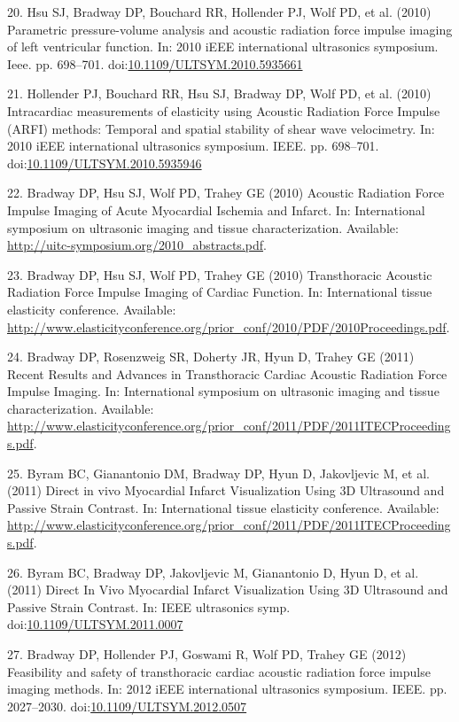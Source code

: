 \documentclass[]{article}
\begin{document}
20. Hsu SJ, Bradway DP, Bouchard RR, Hollender PJ, Wolf PD, et al.
(2010) Parametric pressure-volume analysis and acoustic radiation force
impulse imaging of left ventricular function. In: 2010 iEEE
international ultrasonics symposium. Ieee. pp. 698--701.
doi:\href{http://dx.doi.org/10.1109/ULTSYM.2010.5935661}{10.1109/ULTSYM.2010.5935661}

21. Hollender PJ, Bouchard RR, Hsu SJ, Bradway DP, Wolf PD, et al.
(2010) Intracardiac measurements of elasticity using Acoustic Radiation
Force Impulse (ARFI) methods: Temporal and spatial stability of shear
wave velocimetry. In: 2010 iEEE international ultrasonics symposium.
IEEE. pp. 698--701.
doi:\href{http://dx.doi.org/10.1109/ULTSYM.2010.5935946}{10.1109/ULTSYM.2010.5935946}

22. Bradway DP, Hsu SJ, Wolf PD, Trahey GE (2010) Acoustic Radiation
Force Impulse Imaging of Acute Myocardial Ischemia and Infarct. In:
International symposium on ultrasonic imaging and tissue
characterization. Available:
\url{http://uitc-symposium.org/2010_abstracts.pdf}.

23. Bradway DP, Hsu SJ, Wolf PD, Trahey GE (2010) Transthoracic Acoustic
Radiation Force Impulse Imaging of Cardiac Function. In: International
tissue elasticity conference. Available:
\url{http://www.elasticityconference.org/prior_conf/2010/PDF/2010Proceedings.pdf}.

24. Bradway DP, Rosenzweig SR, Doherty JR, Hyun D, Trahey GE (2011)
Recent Results and Advances in Transthoracic Cardiac Acoustic Radiation
Force Impulse Imaging. In: International symposium on ultrasonic imaging
and tissue characterization. Available:
\url{http://www.elasticityconference.org/prior_conf/2011/PDF/2011ITECProceedings.pdf}.

25. Byram BC, Gianantonio DM, Bradway DP, Hyun D, Jakovljevic M, et al.
(2011) Direct in vivo Myocardial Infarct Visualization Using 3D
Ultrasound and Passive Strain Contrast. In: International tissue
elasticity conference. Available:
\url{http://www.elasticityconference.org/prior_conf/2011/PDF/2011ITECProceedings.pdf}.

26. Byram BC, Bradway DP, Jakovljevic M, Gianantonio D, Hyun D, et al.
(2011) Direct In Vivo Myocardial Infarct Visualization Using 3D
Ultrasound and Passive Strain Contrast. In: IEEE ultrasonics symp.
doi:\href{http://dx.doi.org/10.1109/ULTSYM.2011.0007}{10.1109/ULTSYM.2011.0007}

27. Bradway DP, Hollender PJ, Goswami R, Wolf PD, Trahey GE (2012)
Feasibility and safety of transthoracic cardiac acoustic radiation force
impulse imaging methods. In: 2012 iEEE international ultrasonics
symposium. IEEE. pp. 2027--2030.
doi:\href{http://dx.doi.org/10.1109/ULTSYM.2012.0507}{10.1109/ULTSYM.2012.0507}
\end{document}
